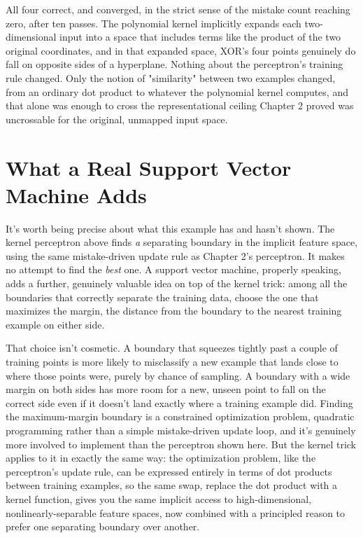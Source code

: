 All four correct, and converged, in the strict sense of the mistake count reaching zero, after ten passes. The polynomial kernel implicitly expands each two-dimensional input into a space that includes terms like the product of the two original coordinates, and in that expanded space, XOR's four points genuinely do fall on opposite sides of a hyperplane. Nothing about the perceptron's training rule changed. Only the notion of "similarity" between two examples changed, from an ordinary dot product to whatever the polynomial kernel computes, and that alone was enough to cross the representational ceiling Chapter 2 proved was uncrossable for the original, unmapped input space.

\section*{What a Real Support Vector Machine Adds}

It's worth being precise about what this example has and hasn't shown. The kernel perceptron above finds \emph{a} separating boundary in the implicit feature space, using the same mistake-driven update rule as Chapter 2's perceptron. It makes no attempt to find the \emph{best} one. A support vector machine, properly speaking, adds a further, genuinely valuable idea on top of the kernel trick: among all the boundaries that correctly separate the training data, choose the one that maximizes the margin, the distance from the boundary to the nearest training example on either side.

That choice isn't cosmetic. A boundary that squeezes tightly past a couple of training points is more likely to misclassify a new example that lands close to where those points were, purely by chance of sampling. A boundary with a wide margin on both sides has more room for a new, unseen point to fall on the correct side even if it doesn't land exactly where a training example did. Finding the maximum-margin boundary is a constrained optimization problem, quadratic programming rather than a simple mistake-driven update loop, and it's genuinely more involved to implement than the perceptron shown here. But the kernel trick applies to it in exactly the same way: the optimization problem, like the perceptron's update rule, can be expressed entirely in terms of dot products between training examples, so the same swap, replace the dot product with a kernel function, gives you the same implicit access to high-dimensional, nonlinearly-separable feature spaces, now combined with a principled reason to prefer one separating boundary over another.

